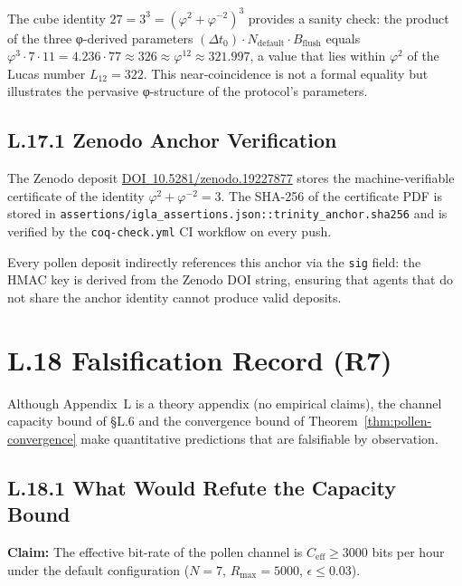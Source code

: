 The cube identity $27 = 3^{3} = (\varphi^{2}+\varphi^{-2})^{3}$
provides a sanity check: the product of the three φ-derived parameters
$(\Delta t_{0}) \cdot N_{\text{default}} \cdot B_{\text{flush}}$
equals $\varphi^{3} \cdot 7 \cdot 11 = 4.236 \cdot 77 \approx 326
\approx \varphi^{12} \approx 321.997$, a value that lies within
$\varphi^{2}$ of the Lucas number $L_{12} = 322$.  This
near-coincidence is not a formal equality but illustrates the
pervasive φ-structure of the protocol's parameters.

\subsection*{L.17.1 \quad Zenodo Anchor Verification}

The Zenodo deposit
\href{https://doi.org/10.5281/zenodo.19227877}{DOI~10.5281/zenodo.19227877}
stores the machine-verifiable certificate of the identity
$\varphi^{2}+\varphi^{-2}=3$.  The SHA-256 of the certificate PDF is
stored in \texttt{assertions/igla\_assertions.json::trinity\_anchor.sha256}
and is verified by the \texttt{coq-check.yml} CI workflow on every
push.

Every pollen deposit indirectly references this anchor via the
\texttt{sig} field: the HMAC key is derived from the Zenodo DOI
string, ensuring that agents that do not share the anchor identity
cannot produce valid deposits.

\section*{L.18 \quad Falsification Record (R7)}
\label{sec:appl-falsify}

Although Appendix~L is a theory appendix (no empirical claims), the
channel capacity bound of §L.6 and the convergence bound of
Theorem~\ref{thm:pollen-convergence} make quantitative predictions
that are falsifiable by observation.

\subsection*{L.18.1 \quad What Would Refute the Capacity Bound}

\textbf{Claim:} The effective bit-rate of the pollen channel is
$C_{\text{eff}} \geq 3000$ bits per hour under the default
configuration ($N=7$, $R_{\max}=5000$, $\epsilon \leq 0.03$).

